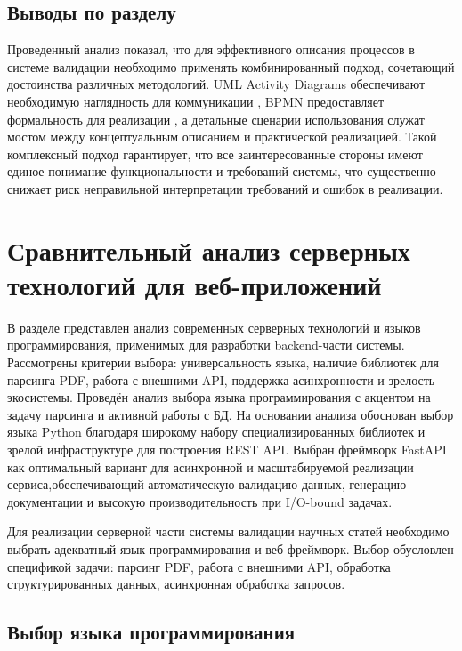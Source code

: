 \subsection{Выводы по разделу}
Проведенный анализ показал, что для эффективного описания процессов в системе валидации 
необходимо применять комбинированный подход, сочетающий достоинства различных методологий.
UML Activity Diagrams обеспечивают необходимую наглядность для коммуникации \cite{uml}, 
BPMN предоставляет формальность для реализации \cite{business-laguna,info-tech}, а детальные сценарии
использования служат мостом между концептуальным описанием и практической реализацией. 
Такой комплексный подход гарантирует, что все заинтересованные стороны имеют
единое понимание функциональности и требований системы, что существенно снижает риск
неправильной интерпретации требований и ошибок в реализации.


\section{Сравнительный анализ серверных технологий для веб-приложений}
\begin{annotation}
	В разделе представлен анализ современных серверных технологий и языков
	программирования, применимых для разработки backend-части системы. Рассмотрены критерии 
	выбора: универсальность языка, наличие библиотек для парсинга PDF, работа с
	внешними API, поддержка асинхронности и зрелость экосистемы. Проведён анализ выбора 
	языка программирования с акцентом на задачу парсинга и активной работы с БД. На
	основании анализа обоснован выбор языка Python благодаря широкому набору специализированных
	библиотек и зрелой инфраструктуре для построения REST API. Выбран фреймворк 
	FastAPI как оптимальный вариант для асинхронной и масштабируемой реализации
	сервиса,обеспечивающий автоматическую валидацию данных, генерацию документации и
	высокую производительность при I/O-bound задачах.
\end{annotation}

Для реализации серверной части системы валидации научных статей необходимо выбрать
адекватный язык программирования и веб-фреймворк. Выбор обусловлен спецификой задачи:
парсинг PDF, работа с внешними API, обработка структурированных данных,
асинхронная обработка запросов.

\subsection{Выбор языка программирования}

